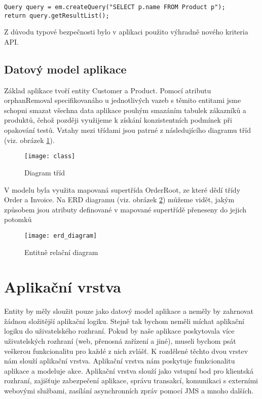 \documentclass[122pt,oneside]{fithesis}
\begin{document}
\begin{lstlisting}
Query query = em.createQuery("SELECT p.name FROM Product p");
return query.getResultList();
\end{lstlisting}

Z důvodu typové bezpečnosti bylo v aplikaci použito výhradně nového kriteria API.

\subsection{Datový model aplikace}
Základ aplikace tvoří entity Customer a Product. Pomocí atributu orphanRemoval specifikovanáho u jednotlivých vazeb s těmito entitami jsme schopni smazat všechna data aplikace pouhým smazáním tabulek zákazníků a produktů, čehož později využijeme k získání konzistentních podmínek při opakování testů. Vztahy mezi třídami jsou patrné z následujícího diagramu tříd (viz. obrázek \ref{fig:class}).

\begin{figure}[!ht]
\centering
\texttt{[image: class]}
\caption{Diagram tříd}
\label{fig:class}
\end{figure}

V modelu byla využita mapovaná supertřída OrderRoot, ze které dědí třídy Order a Invoice. Na ERD diagramu (viz. obrázek \ref{fig:erd}) můžeme vidět, jakým způsobem jsou atributy definované v mapované supertřídě přeneseny do jejich potomků

\begin{figure}[!ht]
\centering
\texttt{[image: erd\_diagram]}
\caption{Entitně relační diagram}
\label{fig:erd}
\end{figure}


\section{Aplikační vrstva}
Entity by měly sloužit pouze jako datový model aplikace a neměly by zahrnovat žádnou složitější aplikační logiku. Stejně tak bychom neměli míchat aplikační logiku do uživatelského rozhraní. Pokud by naše aplikace poskytovala více uživatelských rozhraní (web, přenosná zařízení a jiné), museli bychom psát veškerou funkcionalitu pro každé z nich zvlášť. K rozdělené těchto dvou vrstev nám slouží aplikační vrstva. Aplikační vrstva nám poskytuje funkcionalitu aplikace a modeluje akce. Aplikační vrstva slouží jako vstupní bod pro klientská rozhraní, zajišťuje zabezpečení aplikace, správu transakcí, komunikaci s externími webovými službami, zasílání asynchronních zpráv pomocí JMS a mnoho dalších. 
\end{document}
